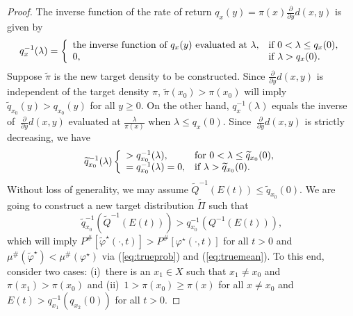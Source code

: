 \documentclass[10pt,a4paper]{amsart}
\begin{document}
\begin{proof}
The inverse function of the  rate of return $q_x(y)=\pi(x) \frac{\partial}{\partial y}d(x,y)$ is given by
\begin{equation*}
q^{-1}_x(\lambda)=\left\{
		                           \begin{array}{ll}
		                           \text{the inverse function of $q_x(y)$  evaluated at $\lambda$},& \hbox{if $0<\lambda\leq q_x(0)$,} \\
					0, & \hbox{if $\lambda>q_x(0)$.} 
		                          \end{array}
		                         \right.
\end{equation*}	
Suppose $\widetilde{\pi}$ is the new target density to be constructed.  Since $\frac{\partial}{\partial y}d(x, y)$ is independent of the target density $\pi$,  $\widetilde{\pi}(x_0)>\pi(x_0)$ will imply $\widetilde{q}_{x_0}(y)> q_{x_0}(y)$ for all $y\geq 0$.  On the other hand,  $q_x^{-1}(\lambda)$ equals the inverse of $\ \frac{\partial}{\partial y}d(x, y)$ evaluated at $\frac{\lambda}{\pi(x)}$ when $\lambda\leq q_x(0)$.  Since $\ \frac{\partial}{\partial y}d(x, y)$ is strictly decreasing, we have
\begin{equation}
\label{eq:discrete1}
\widetilde{q}^{-1}_{x_0}(\lambda)\left\{
		                           \begin{array}{ll}
		                           >q_{x_0}^{-1}(\lambda),& \hbox{for $0<\lambda\leq \widetilde{q}_{x_0}(0)$,} \\
					=q_{x_0}^{-1}(\lambda)=0, & \hbox{if $\lambda>\widetilde{q}_{x_0}(0)$.} 
		                          \end{array}
		                         \right.
\end{equation}	
Without loss of generality, we may assume $\widetilde{Q}^{-1}(E(t))\leq \widetilde{q}_{x_0}(0)$.
We are going to construct a new target distribution $\widetilde{\Pi}$ such that
\begin{equation}
\label{eq:condition}
\widetilde{q}_{x_0}^{-1}(\widetilde{Q}^{-1}(E(t)))>q_{x_0}^{-1}(Q^{-1}(E(t))),
\end{equation}
which will imply $P^{\#}[\widetilde{\varphi}^\star(\cdot, t)]>P^{\#}[\varphi^\star(\cdot, t)]$ for all $t>0$ and $\mu^{\#}(\widetilde{\varphi}^\star)<\mu^{\#}(\varphi^\star)$ via (\ref{eq:trueprob}) and (\ref{eq:truemean}). To this end,  consider two cases: (i)~there is an $x_1\in X$ such that $x_1\neq x_0$ and $\pi(x_1)>\pi(x_0)$ and (ii)~$1>\pi(x_0)\geq \pi(x)$ for all $x\neq  x_0$ and $E(t)>q_{x_1}^{-1}(q_{x_2}(0))$ for all $t>0$.


\end{proof}
\end{document}
